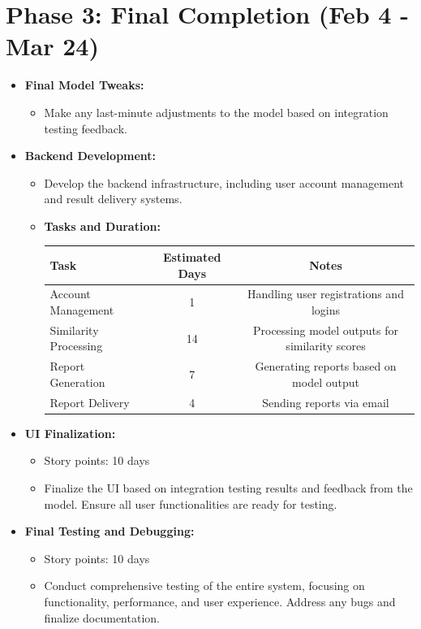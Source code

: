 \documentclass[12pt]{article}
\begin{document}
\section*{Phase 3: Final Completion (Feb 4 - Mar 24)}
\begin{itemize}
    \item \textbf{Final Model Tweaks:}
    \begin{itemize}
        \item Make any last-minute adjustments to the model based on integration testing feedback.
    \end{itemize}

    \item \textbf{Backend Development:}
    \begin{itemize}
        \item Develop the backend infrastructure, including user account management and result delivery systems.
        \item \textbf{Tasks and Duration:}

        \begin{tabular}{|>{\raggedright}p{4cm}|c|c|}
            \hline
            \textbf{Task} & \textbf{Estimated Days} & \textbf{Notes} \\
            \hline
            Account Management & 1 & Handling user registrations and logins \\
            Similarity Processing & 14 &  Processing model outputs for similarity scores \\
            Report Generation & 7 & Generating reports based on model output \\
            Report Delivery & 4 & Sending reports via email \\
            \hline
        \end{tabular}
    \end{itemize}

    \item \textbf{UI Finalization:}
    \begin{itemize}
        \item Story points: 10 days
        \item Finalize the UI based on integration testing results and feedback from the model. Ensure all user functionalities are ready for testing.
    \end{itemize}

    \item \textbf{Final Testing and Debugging:}
    \begin{itemize}
        \item Story points: 10 days
        \item Conduct comprehensive testing of the entire system, focusing on functionality, performance, and user experience. Address any bugs and finalize documentation.
    \end{itemize}
\end{itemize}
\end{document}

